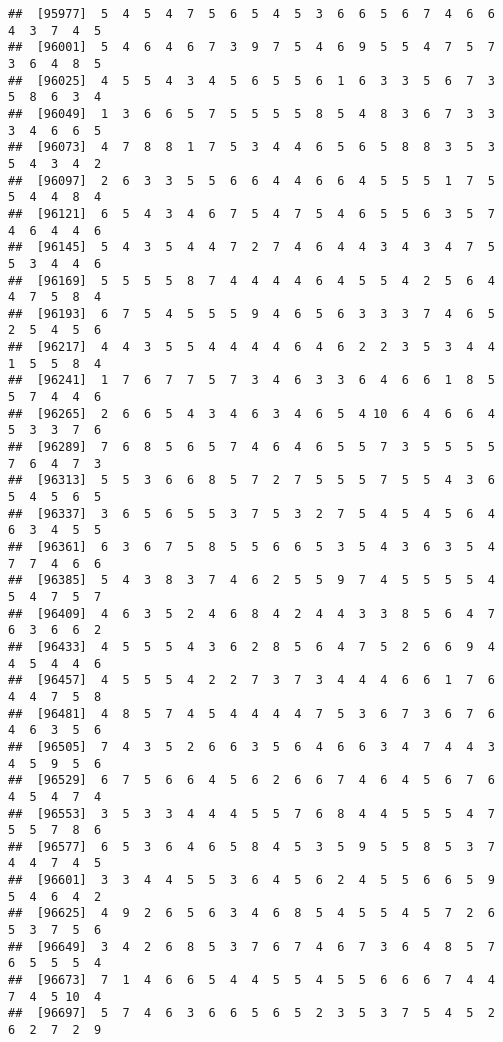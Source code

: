 \documentclass[
]{book}
\begin{document}
\begin{verbatim}
##  [95977]  5  4  5  4  7  5  6  5  4  5  3  6  6  5  6  7  4  6  6  4  3  7  4  5
##  [96001]  5  4  6  4  6  7  3  9  7  5  4  6  9  5  5  4  7  5  7  3  6  4  8  5
##  [96025]  4  5  5  4  3  4  5  6  5  5  6  1  6  3  3  5  6  7  3  5  8  6  3  4
##  [96049]  1  3  6  6  5  7  5  5  5  5  8  5  4  8  3  6  7  3  3  3  4  6  6  5
##  [96073]  4  7  8  8  1  7  5  3  4  4  6  5  6  5  8  8  3  5  3  5  4  3  4  2
##  [96097]  2  6  3  3  5  5  6  6  4  4  6  6  4  5  5  5  1  7  5  5  4  4  8  4
##  [96121]  6  5  4  3  4  6  7  5  4  7  5  4  6  5  5  6  3  5  7  4  6  4  4  6
##  [96145]  5  4  3  5  4  4  7  2  7  4  6  4  4  3  4  3  4  7  5  5  3  4  4  6
##  [96169]  5  5  5  5  8  7  4  4  4  4  6  4  5  5  4  2  5  6  4  4  7  5  8  4
##  [96193]  6  7  5  4  5  5  5  9  4  6  5  6  3  3  3  7  4  6  5  2  5  4  5  6
##  [96217]  4  4  3  5  5  4  4  4  4  6  4  6  2  2  3  5  3  4  4  1  5  5  8  4
##  [96241]  1  7  6  7  7  5  7  3  4  6  3  3  6  4  6  6  1  8  5  5  7  4  4  6
##  [96265]  2  6  6  5  4  3  4  6  3  4  6  5  4 10  6  4  6  6  4  5  3  3  7  6
##  [96289]  7  6  8  5  6  5  7  4  6  4  6  5  5  7  3  5  5  5  5  7  6  4  7  3
##  [96313]  5  5  3  6  6  8  5  7  2  7  5  5  5  7  5  5  4  3  6  5  4  5  6  5
##  [96337]  3  6  5  6  5  5  3  7  5  3  2  7  5  4  5  4  5  6  4  6  3  4  5  5
##  [96361]  6  3  6  7  5  8  5  5  6  6  5  3  5  4  3  6  3  5  4  7  7  4  6  6
##  [96385]  5  4  3  8  3  7  4  6  2  5  5  9  7  4  5  5  5  5  4  5  4  7  5  7
##  [96409]  4  6  3  5  2  4  6  8  4  2  4  4  3  3  8  5  6  4  7  6  3  6  6  2
##  [96433]  4  5  5  5  4  3  6  2  8  5  6  4  7  5  2  6  6  9  4  4  5  4  4  6
##  [96457]  4  5  5  5  4  2  2  7  3  7  3  4  4  4  6  6  1  7  6  4  4  7  5  8
##  [96481]  4  8  5  7  4  5  4  4  4  4  7  5  3  6  7  3  6  7  6  4  6  3  5  6
##  [96505]  7  4  3  5  2  6  6  3  5  6  4  6  6  3  4  7  4  4  3  4  5  9  5  6
##  [96529]  6  7  5  6  6  4  5  6  2  6  6  7  4  6  4  5  6  7  6  4  5  4  7  4
##  [96553]  3  5  3  3  4  4  4  5  5  7  6  8  4  4  5  5  5  4  7  5  5  7  8  6
##  [96577]  6  5  3  6  4  6  5  8  4  5  3  5  9  5  5  8  5  3  7  4  4  7  4  5
##  [96601]  3  3  4  4  5  5  3  6  4  5  6  2  4  5  5  6  6  5  9  5  4  6  4  2
##  [96625]  4  9  2  6  5  6  3  4  6  8  5  4  5  5  4  5  7  2  6  5  3  7  5  6
##  [96649]  3  4  2  6  8  5  3  7  6  7  4  6  7  3  6  4  8  5  7  6  5  5  5  4
##  [96673]  7  1  4  6  6  5  4  4  5  5  4  5  5  6  6  6  7  4  4  7  4  5 10  4
##  [96697]  5  7  4  6  3  6  6  5  6  5  2  3  5  3  7  5  4  5  2  6  2  7  2  9

\end{verbatim}
\end{document}
